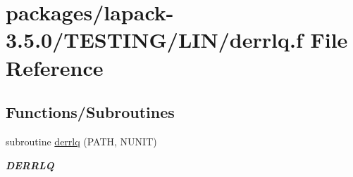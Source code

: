 \hypertarget{derrlq_8f}{}\section{packages/lapack-\/3.5.0/\+T\+E\+S\+T\+I\+N\+G/\+L\+I\+N/derrlq.f File Reference}
\label{derrlq_8f}
\subsection*{Functions/\+Subroutines}
\begin{DoxyCompactItemize}
\item 
subroutine \hyperlink{group__double__lin_ga982ba776f732f2321cda47f6a1933412}{derrlq} (P\+A\+T\+H, N\+U\+N\+I\+T)
\begin{DoxyCompactList}\small\item\em {\bfseries D\+E\+R\+R\+L\+Q} \end{DoxyCompactList}\end{DoxyCompactItemize}
